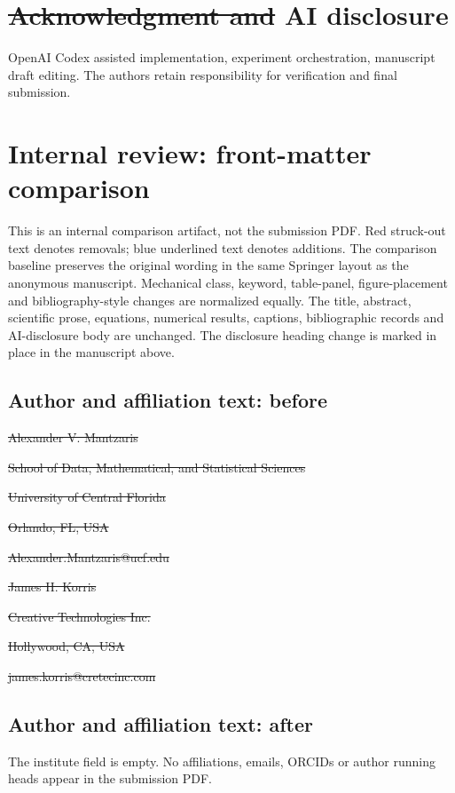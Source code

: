 \documentclass{llncs}
\providecommand{\DIFaddtex}[1]{{\protect\color{blue}\uwave{#1}}} %
\providecommand{\DIFdeltex}[1]{{\protect\color{red}\sout{#1}}}                      %
\providecommand{\DIFdelbegin}{} %
\providecommand{\DIFdelend}{} %
\providecommand{\DIFadd}[1]{\texorpdfstring{\DIFaddtex{#1}}{#1}} %
\providecommand{\DIFdel}[1]{\texorpdfstring{\DIFdeltex{#1}}{}} %
\begin{document}
\section*{\DIFdelbegin \DIFdel{Acknowledgment and }\DIFdelend AI disclosure}
OpenAI Codex assisted implementation, experiment orchestration, manuscript draft
editing. The authors retain responsibility
for verification and final submission. 







\clearpage
\section*{Internal review: front-matter comparison}
This is an internal comparison artifact, not the submission PDF.
Red struck-out text denotes removals; blue underlined text denotes additions.
The comparison baseline preserves the original wording in the same Springer
layout as the anonymous manuscript. Mechanical class, keyword, table-panel,
figure-placement and bibliography-style changes are normalized equally.
The title, abstract, scientific prose, equations, numerical results, captions,
bibliographic records and AI-disclosure body are unchanged.
The disclosure heading change is marked in place in the manuscript above.

\subsection*{Author and affiliation text: before}
\noindent\DIFdel{Alexander V. Mantzaris}\par
\noindent\DIFdel{School of Data, Mathematical, and Statistical Sciences}\par
\noindent\DIFdel{University of Central Florida}\par
\noindent\DIFdel{Orlando, FL, USA}\par
\noindent\DIFdel{Alexander.Mantzaris@ucf.edu}\par
\medskip
\noindent\DIFdel{James H. Korris}\par
\noindent\DIFdel{Creative Technologies Inc.}\par
\noindent\DIFdel{Hollywood, CA, USA}\par
\noindent\DIFdel{james.korris@cretecinc.com}\par

\subsection*{Author and affiliation text: after}
\noindent\DIFadd{Anonymous Author(s)}\par
The institute field is empty. No affiliations, emails, ORCIDs or author
running heads appear in the submission PDF.
\end{document}
